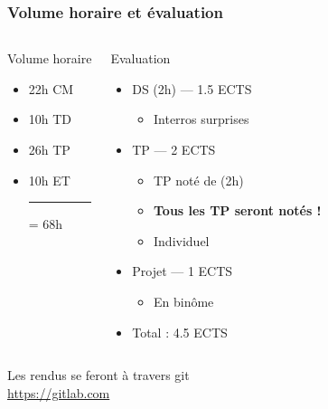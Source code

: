 \documentclass[12pt,svgnames]{beamer}
\begin{document}
\begin{frame}
	\frametitle{Volume horaire et évaluation}
	\begin{columns}[t]
	\begin{block}{Volume horaire}
		\begin{itemize}
			\item 22h CM
			\item 10h TD
			\item 26h TP
			\item 10h ET \\
			\vspace{-0.5em}
			\rule{0.8\linewidth}{0.4pt}\par
			= 68h
			
		\end{itemize}
	\end{block}{}

	\begin{block}{Evaluation}
		\begin{itemize}
			\item DS (2h) --- 1.5 ECTS
			\begin{itemize}
				\item Interros surprises
			\end{itemize}
			\item TP --- 2 ECTS
			\begin{itemize}
				\item TP noté de (2h)
				\item \textbf{Tous les TP seront notés !}
				\item Individuel				
			\end{itemize}
			\item Projet --- 1 ECTS
			\begin{itemize}
				\item En binôme 
			\end{itemize}
			\item Total : 4.5 ECTS
		\end{itemize}
	\end{block}{}	
	\end{columns}
	\begin{center}
	\large Les rendus se feront à travers git \\ \url{https://gitlab.com}
	\end{center}
\end{frame}
\end{document}

